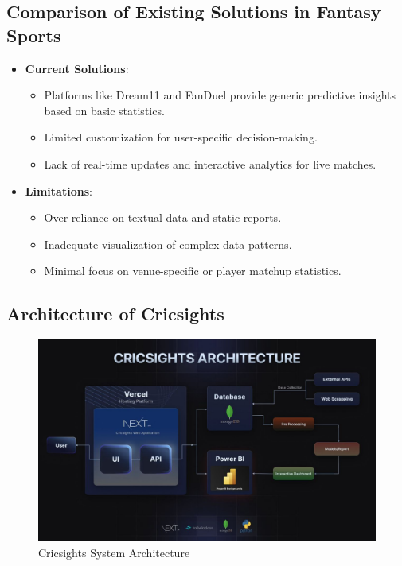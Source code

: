 \subsection{Comparison of Existing Solutions in Fantasy Sports}
\begin{itemize}
    \item \textbf{Current Solutions}:
    \begin{itemize}
        \item Platforms like Dream11 and FanDuel provide generic predictive insights based on basic statistics.
        \item Limited customization for user-specific decision-making.
        \item Lack of real-time updates and interactive analytics for live matches.
    \end{itemize}
    \item \textbf{Limitations}:
    \begin{itemize}
        \item Over-reliance on textual data and static reports.
        \item Inadequate visualization of complex data patterns.
        \item Minimal focus on venue-specific or player matchup statistics.
    \end{itemize}
\end{itemize}
\subsection{Architecture of Cricsights}
\begin{figure}[H]
    \centering
    \includegraphics[width=\textwidth]{cricsight_architecuture.jpg}
    \caption{Cricsights System Architecture}
    \label{fig:architecture}
\end{figure}

